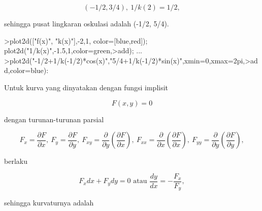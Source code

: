 \documentclass[a4paper,10pt]{article}
\begin{document}
\begin{eulernotebook}
\begin{eulercomment}
\end{eulercomment}
\begin{eulerformula}
\[
(-1/2,3/4),\ 1/k(2)=1/2,
\]
\end{eulerformula}
\begin{eulercomment}
sehingga pusat lingkaran oskulasi adalah (-1/2, 5/4).
\end{eulercomment}
\begin{eulerprompt}
>plot2d(["f(x)", "k(x)"],-2,1, color=[blue,red]); plot2d("1/k(x)",-1.5,1,color=green,>add); ...
>plot2d("-1/2+1/k(-1/2)*cos(x)","5/4+1/k(-1/2)*sin(x)",xmin=0,xmax=2pi,>add,color=blue):
\end{eulerprompt}
\begin{eulercomment}
Untuk kurva yang dinyatakan dengan fungsi implisit

\end{eulercomment}
\begin{eulerformula}
\[
F(x,y)=0
\]
\end{eulerformula}
\begin{eulercomment}
dengan turunan-turunan parsial

\end{eulercomment}
\begin{eulerformula}
\[
F_x=\frac{\partial F}{\partial x},\ F_y=\frac{\partial F}{\partial y},\ F_{xy}=\frac{\partial}{\partial y}\left(\frac{\partial F}{\partial x}\right),\ F_{xx}=\frac{\partial}{\partial x}\left(\frac{\partial F}{\partial x}\right),\ F_{yy}=\frac{\partial}{\partial y}\left(\frac{\partial F}{\partial y}\right),
\]
\end{eulerformula}
\begin{eulercomment}
berlaku

\end{eulercomment}
\begin{eulerformula}
\[
F_x dx+ F_y dy = 0\text{ atau } \frac{dy}{dx}=-\frac{F_x}{F_y},
\]
\end{eulerformula}
\begin{eulercomment}
sehingga kurvaturnya adalah


\end{eulercomment}
\end{eulernotebook}
\end{document}
